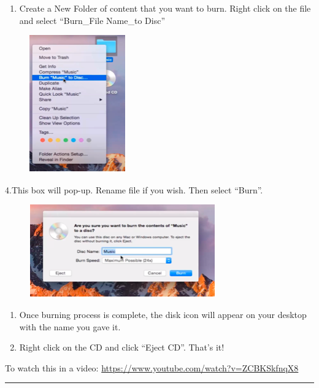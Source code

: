 \documentclass[]{book}
\providecommand{\tightlist}{%
  \setlength{\itemsep}{0pt}\setlength{\parskip}{0pt}}
\begin{document}
\begin{enumerate}
\def\labelenumi{\arabic{enumi}.}
\setcounter{enumi}{2}
\tightlist
\item
  Create a New Folder of content that you want to burn. Right click on the file and select ``Burn\_File Name\_to Disc''
\end{enumerate}

\begin{figure}
\centering
\includegraphics{images/lab_protocols/cd_burning/2.png}
\caption{}
\end{figure}

4.This box will pop-up. Rename file if you wish. Then select ``Burn''.

\begin{figure}
\centering
\includegraphics{images/lab_protocols/cd_burning/3.png}
\caption{}
\end{figure}

\begin{enumerate}
\def\labelenumi{\arabic{enumi}.}
\setcounter{enumi}{4}
\item
  Once burning process is complete, the disk icon will appear on your desktop with the name you gave it.
\item
  Right click on the CD and click ``Eject CD''. That's it!
\end{enumerate}

To watch this in a video: \url{https://www.youtube.com/watch?v=ZCBKSkfnqX8}

\begin{center}\rule{0.5\linewidth}{0.5pt}\end{center}
\end{document}
